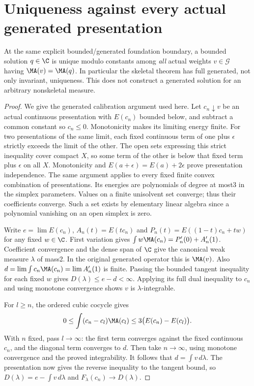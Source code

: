 \section{Uniqueness against every actual generated presentation}
\begin{theorem}\label{newrad:Gunique}
At the same explicit bounded/generated foundation boundary, a bounded
solution $q\in\C$ is unique modulo constants among \emph{all}
actual weights $v\in\mathcal G$ having $\MA(v)=\MA(q)$.
In particular the skeletal theorem has full generated, not only
invariant, uniqueness. This does not construct a generated solution
for an arbitrary nonskeletal measure.
\end{theorem}
\begin{proof}
We give the generated calibration argument used here. Let
$c_n\downarrow v$ be an actual continuous presentation with
$E(c_n)$ bounded below, and subtract a common constant so $c_n\le0$.
Monotonicity makes its limiting energy finite. For two presentations
of the same limit, each fixed continuous term of one plus $\epsilon$
strictly exceeds the limit of the other. The open sets expressing
this strict inequality cover compact $X$, so some term of the other
is below that fixed term plus $\epsilon$ on all $X$. Monotonicity
and $E(a+\epsilon)=E(a)+2\epsilon$ prove presentation independence.
The same argument applies to every fixed finite convex combination
of presentations. Its energies are polynomials of degree at most3
in the simplex parameters. Values on a finite unisolvent set converge;
thus their coefficients converge. Such a set exists by elementary
linear algebra since a polynomial vanishing on an open simplex is zero.

Write $e=\lim E(c_n)$, $A_n(t)=E(tc_n)$ and
$P_n(t)=E((1-t)c_n+tw)$ for any fixed $w\in\C$.
First variation gives
$\int w\MA(c_n)=P'_n(0)+A'_n(1)$. Coefficient convergence and
the dense span of $\C$ give the canonical weak measure $\lambda$
of mass2. In the original generated operator this is $\MA(v)$.
Also $d=\lim\int c_n\MA(c_n)=\lim A'_n(1)$ is finite.
Passing the bounded tangent inequality for each fixed $w$ gives
$D(\lambda)\le e-d<\infty$. Applying its full dual inequality
to $c_n$ and using monotone convergence shows $v$ is
$\lambda$-integrable.

For $l\ge n$, the ordered cubic cocycle gives
\[
 0\le\int(c_n-c_l)\MA(c_l)
 \le3\bigl(E(c_n)-E(c_l)\bigr).
\]
With $n$ fixed, pass $l\to\infty$: the first term converges against
the fixed continuous $c_n$, and the diagonal term converges to $d$.
Then take $n\to\infty$, using monotone convergence and the proved
integrability. It follows that $d=\int v\,d\lambda$.
The presentation now gives the reverse inequality to the tangent bound,
so $D(\lambda)=e-\int v\,d\lambda$ and
$F_\lambda(c_n)\to D(\lambda)$.


\end{proof}
